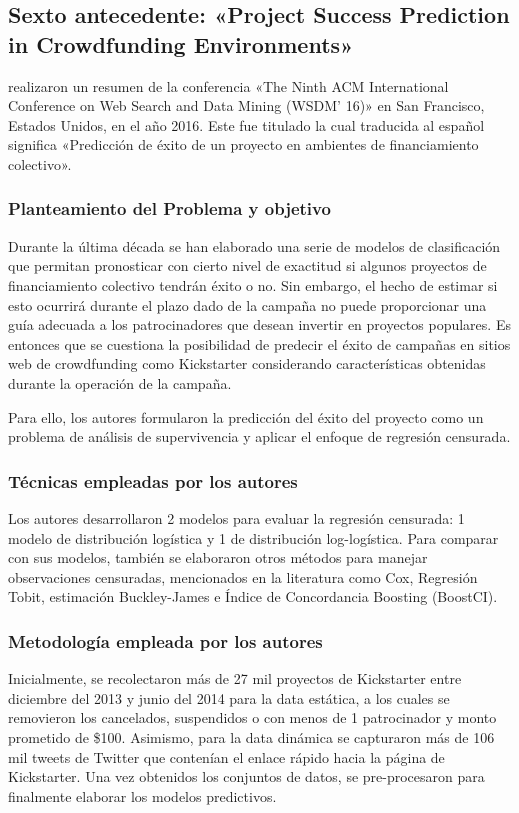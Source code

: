 \subsection{Sexto antecedente: «Project Success Prediction in Crowdfunding Environments» \citep*{pr_li2016predcrowd}}
\citeauthor{pr_li2016predcrowd} realizaron un resumen de la conferencia «The Ninth ACM International Conference on Web Search and Data Mining (WSDM’ 16)» en San Francisco, Estados Unidos, en el año 2016. Este fue titulado  la cual traducida al español significa «Predicción de éxito de un proyecto en ambientes de financiamiento colectivo».

\subsubsection{Planteamiento del Problema y objetivo}
Durante la última década se han elaborado una serie de modelos de clasificación que permitan pronosticar con cierto nivel de exactitud si algunos proyectos de financiamiento colectivo tendrán éxito o no. Sin embargo, el hecho de estimar si esto ocurrirá durante el plazo dado de la campaña no puede proporcionar una guía adecuada a los patrocinadores que desean invertir en proyectos populares. Es entonces que se cuestiona la posibilidad de predecir el éxito de campañas en sitios web de crowdfunding como Kickstarter considerando características obtenidas durante la operación de la campaña.

Para ello, los autores formularon la predicción del éxito del proyecto como un problema de análisis de supervivencia y aplicar el enfoque de regresión censurada.

\subsubsection{Técnicas empleadas por los autores}
Los autores desarrollaron 2 modelos para evaluar la regresión censurada: 1 modelo de distribución logística y 1 de distribución log-logística. Para comparar con sus modelos, también se elaboraron otros métodos para manejar observaciones censuradas, mencionados en la literatura como Cox, Regresión Tobit, estimación Buckley-James e Índice de Concordancia Boosting (BoostCI).

\subsubsection{Metodología empleada por los autores}
Inicialmente, se recolectaron más de 27 mil proyectos de Kickstarter entre diciembre del 2013 y junio del 2014 para la data estática, a los cuales se removieron los cancelados, suspendidos o con menos de 1 patrocinador y monto prometido de \$100. Asimismo, para la data dinámica se capturaron más de 106 mil tweets de Twitter que contenían el enlace rápido hacia la página de Kickstarter. Una vez obtenidos los conjuntos de datos, se pre-procesaron para finalmente elaborar los modelos predictivos.

